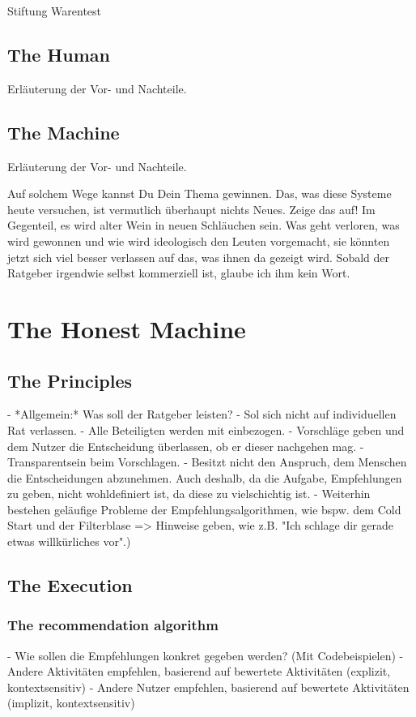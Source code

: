 \documentclass[12pt,numbers=noenddot,parskip,bibliography=totocnumbered,listof=totocnumbered]{scrreprt}
\begin{document}
Stiftung Warentest

\section{The Human}
Erläuterung der Vor- und Nachteile.

\section{The Machine}
Erläuterung der Vor- und Nachteile.

Auf solchem Wege kannst Du Dein Thema gewinnen. Das, was diese Systeme heute versuchen, ist vermutlich überhaupt nichts Neues. Zeige das auf! Im Gegenteil, es wird alter Wein in neuen Schläuchen sein. Was geht verloren, was wird gewonnen und wie wird ideologisch den Leuten vorgemacht, sie könnten jetzt sich viel besser verlassen auf das, was ihnen da gezeigt wird.  Sobald der Ratgeber irgendwie selbst kommerziell ist, glaube ich ihm kein Wort.

\chapter{The Honest Machine}

\section{The Principles}

- *Allgemein:* Was soll der Ratgeber leisten? 
- Sol sich nicht auf individuellen Rat verlassen.
- Alle Beteiligten werden mit einbezogen.
- Vorschläge geben und dem Nutzer die Entscheidung überlassen, ob er dieser nachgehen mag.
- Transparentsein beim Vorschlagen.
- Besitzt nicht den Anspruch, dem Menschen die Entscheidungen abzunehmen. Auch deshalb, da die Aufgabe, Empfehlungen zu geben, nicht wohldefiniert ist, da diese zu vielschichtig ist.
- Weiterhin bestehen geläufige Probleme der Empfehlungsalgorithmen, wie bspw. dem Cold Start und der Filterblase => Hinweise geben, wie z.B. "Ich schlage dir gerade etwas willkürliches vor".)
\section{The Execution}
\subsection{The recommendation algorithm}
- Wie sollen die Empfehlungen konkret gegeben werden? (Mit Codebeispielen)
	- Andere Aktivitäten empfehlen, basierend auf bewertete Aktivitäten (explizit, kontextsensitiv)
	- Andere Nutzer empfehlen, basierend auf bewertete Aktivitäten (implizit, kontextsensitiv)
\end{document}
